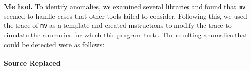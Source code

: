 
{\bf Method.}  To identify anomalies, 
we examined several libraries and found that {\tt mv} seemed
to handle cases that other tools failed to consider.  Following this, we 
used the trace of {\tt mv} as a template and created instructions to modify
the trace to simulate the anomalies for which this program tests.
The resulting anomalies that could be detected were as follows:


%

\paragraph{Source Replaced}

